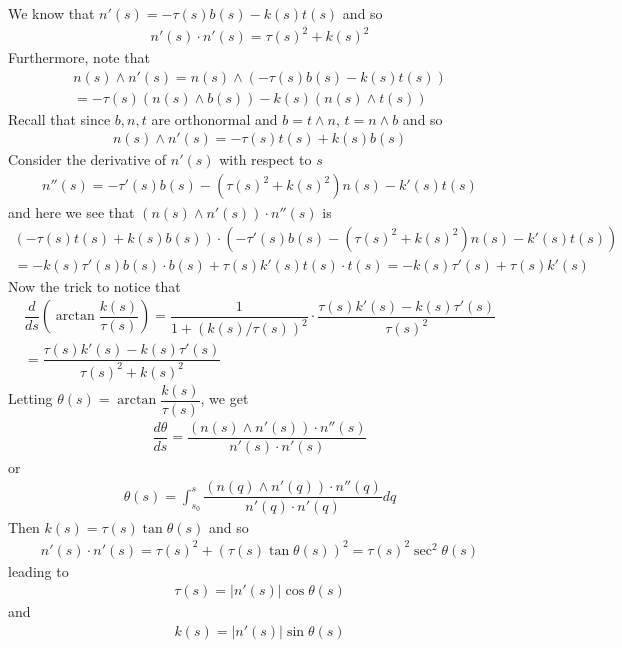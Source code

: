 \documentclass{article}
\begin{document}
	We know that $n'(s) = -\tau(s) b(s) - k(s) t(s)$ and so
	\begin{gather*}
		n'(s) \cdot n'(s) = \tau(s)^2 + k(s)^2
	\end{gather*}
	Furthermore, note that
	\begin{gather*}
		n(s) \wedge n'(s) = n(s) \wedge \left( -\tau(s) b(s) - k(s) t(s) \right) \\
		= -\tau(s) (n(s) \wedge b(s)) - k(s) (n(s) \wedge t(s))
	\end{gather*}
	Recall that since $b, n, t$ are orthonormal and $b = t \wedge n$, $t = n \wedge b$ and so
	\begin{gather*}
		n(s) \wedge n'(s) = -\tau(s) t(s) + k(s) b(s)
	\end{gather*}
	Consider the derivative of $n'(s)$ with respect to $s$
	\begin{gather*}
		n''(s) = -\tau'(s) b(s) - \left( \tau(s)^2 + k(s)^2 \right) n(s) - k'(s) t(s)
	\end{gather*}
	and here we see that $(n(s) \wedge n'(s)) \cdot n''(s)$ is
	\begin{gather*}
		\left( -\tau(s) t(s) + k(s) b(s) \right) \cdot \left( -\tau'(s) b(s) - \left( \tau(s)^2 + k(s)^2 \right) n(s) - k'(s) t(s) \right) \\
		= -k(s) \tau'(s) b(s) \cdot b(s) + \tau(s) k'(s) t(s) \cdot t(s) = -k(s) \tau'(s) + \tau(s) k'(s)
	\end{gather*}
	Now the trick to notice that 
	\begin{gather*}
		\dfrac{d}{ds} \left( \arctan \dfrac{k(s)}{\tau(s)} \right) = \dfrac{1}{1 + \left( k(s)/\tau(s) \right)^2 } \cdot \dfrac{\tau(s) k'(s) - k(s) \tau'(s)}{\tau(s)^2} \\
		= \dfrac{\tau(s) k'(s) - k(s) \tau'(s)}{ \tau(s)^2 + k(s)^2 }
	\end{gather*}
	Letting $\theta(s) = \arctan \dfrac{k(s)}{\tau(s)}$, we get
	\begin{gather*}
		\dfrac{d\theta}{ds} = \dfrac{(n(s) \wedge n'(s)) \cdot n''(s)}{n'(s) \cdot n'(s)}
	\end{gather*}
	or
	\begin{gather*}
		\theta(s) = \int_{s_0}^s \dfrac{(n(q) \wedge n'(q)) \cdot n''(q)}{n'(q) \cdot n'(q)} dq
	\end{gather*}
	Then $k(s) = \tau(s) \tan \theta(s)$ and so
	\begin{gather*}
		n'(s) \cdot n'(s) = \tau(s)^2 + \left( \tau(s) \tan \theta(s) \right)^2 = \tau(s)^2 \sec^2 \theta(s)
	\end{gather*}
	leading to
	\begin{gather*}
		\tau(s) = |n'(s)| \cos \theta(s)
	\end{gather*}
	and
	\begin{gather*}
		k(s) = |n'(s)| \sin \theta(s)
	\end{gather*}
	
\end{document}
